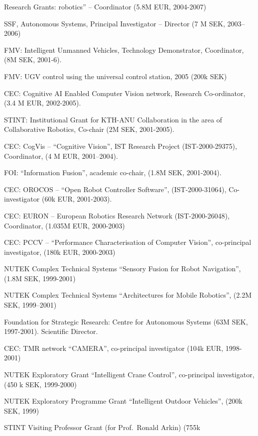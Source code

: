 \documentclass{article}
\begin{document}
\begin{cv}
\begin{cvlist}{Research Grants:}
		robotics''  -- Coordinator (5.8M EUR, 2004-2007) %
		\item SSF, Autonomous Systems, Principal Investigator -- Director  (7
		M SEK, 2003--2006) %
		\item FMV: Intelligent Unmanned Vehicles, Technology Demonstrator,
		Coordinator, (8M SEK, 2001-6). %
		\item FMV: UGV control using the universal control station, 2005 (200k
		SEK) %
		\item CEC: Cognitive AI Enabled Computer Vision network, Research
		Co-ordinator, (3.4 M EUR, 2002-2005). %
		\item STINT: Institutional Grant for KTH-ANU Collaboration in the area
		of Collaborative Robotics, Co-chair (2M SEK, 2001-2005).%
		\item CEC: CogVis -- ``Cognitive Vision'', IST Research Project
		(IST-2000-29375), Coordinator, (4 M EUR, 2001--2004).%
		\item FOI: ``Information Fusion'', academic co-chair,  (1.8M SEK, 2001-2004).%
		\item CEC: OROCOS -- ``Open Robot Controller Software'',
		(IST-2000-31064), Co-investigator (60k EUR, 2001-2003).%
		\item CEC: EURON -- European Robotics Research Network
		(IST-2000-26048), Coordinator, (1.035M EUR, 2000-2003)%
		\item CEC: PCCV -- ``Performance Characterisation of Computer
		Vision'',  co-principal investigator, (180k EUR, 2000-2003)%
		\item NUTEK Complex Technical Systems ``Sensory Fusion for Robot
		Navigation'', (1.8M SEK, 1999-2001)%
		\item NUTEK Complex Technical Systems ``Architectures for Mobile
		Robotics'', (2.2M SEK, 1999--2001)%
		\item Foundation for Strategic Research: Centre for Autonomous Systems
		(63M SEK, 1997-2001). Scientific Director.%
		\item CEC: TMR network ``CAMERA'', co-principal investigator  (104k
		EUR, 1998-2001)%
		\item NUTEK Exploratory Grant ``Intelligent Crane Control'',
		co-principal investigator, (450 k SEK, 1999-2000)%
		\item NUTEK Exploratory Programme Grant ``Intelligent Outdoor
		Vehicles'', (200k SEK, 1999)%
		\item STINT Visiting Professor Grant (for Prof.\ Ronald Arkin)  (755k

\end{cvlist}
\end{cv}
\end{document}

